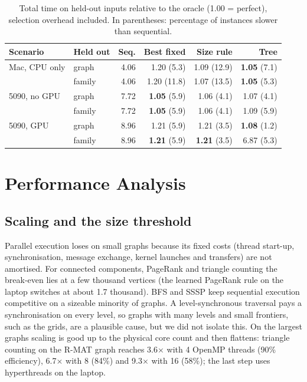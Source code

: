 \documentclass[conference]{IEEEtran}
\begin{document}
\begin{table}[!tb]
\caption{Total time on held-out inputs relative to the oracle (1.00 = perfect), selection overhead included. In parentheses: percentage of instances slower than sequential.}
\label{tab:selector}
\centering\footnotesize\setlength{\tabcolsep}{3pt}
\begin{tabular}{@{}llrrrr@{}}
\toprule
Scenario & Held out & Seq. & Best fixed & Size rule & Tree \\
\midrule
Mac, CPU only & graph & 4.06 & 1.20 (5.3) & 1.09 (12.9) & \textbf{1.05} (7.1) \\
 & family & 4.06 & 1.20 (11.8) & 1.07 (13.5) & \textbf{1.05} (5.3) \\
5090, no GPU & graph & 7.72 & \textbf{1.05} (5.9) & 1.06 (4.1) & 1.07 (4.1) \\
 & family & 7.72 & \textbf{1.05} (5.9) & 1.06 (4.1) & 1.09 (5.9) \\
5090, GPU & graph & 8.96 & 1.21 (5.9) & 1.21 (3.5) & \textbf{1.08} (1.2) \\
 & family & 8.96 & \textbf{1.21} (5.9) & \textbf{1.21} (3.5) & 6.87 (5.3) \\
\bottomrule
\end{tabular}
\end{table}

\section{Performance Analysis}\label{sec:analysis}
\subsection{Scaling and the size threshold}
Parallel execution loses on small graphs because its fixed costs (thread start-up, synchronisation, message exchange, kernel launches and transfers) are not amortised. For connected components, PageRank and triangle counting the break-even lies at a few thousand vertices (the learned PageRank rule on the laptop switches at about 1.7 thousand). BFS and SSSP keep sequential execution competitive on a sizeable minority of graphs. A level-synchronous traversal pays a synchronisation on every level, so graphs with many levels and small frontiers, such as the grids, are a plausible cause, but we did not isolate this. On the largest graphs scaling is good up to the physical core count and then flattens: triangle counting on the R-MAT graph reaches 3.6$\times$ with 4 OpenMP threads (90\% efficiency), 6.7$\times$ with 8 (84\%) and 9.3$\times$ with 16 (58\%); the last step uses hyperthreads on the laptop.
\end{document}
